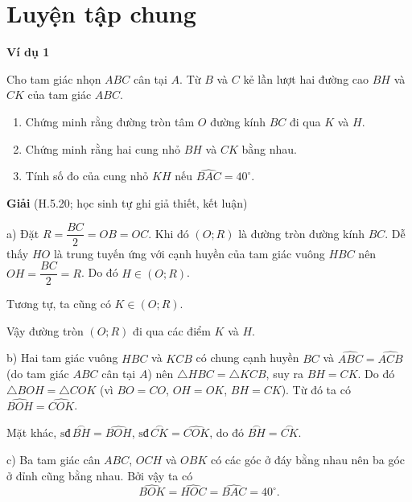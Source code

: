 
\section*{Luyện tập chung}

\begin{lesson}
    \textbf{Ví dụ 1}

    Cho tam giác nhọn $ABC$ cân tại $A$. Từ $B$ và $C$ kẻ lần lượt hai đường cao $BH$ và $CK$ của tam giác $ABC$.

    \begin{enumerate}[label=\alph*)]
        \item Chứng minh rằng đường tròn tâm $O$ đường kính $BC$ đi qua $K$ và $H$.
        \item Chứng minh rằng hai cung nhỏ $BH$ và $CK$ bằng nhau.
        \item Tính số đo của cung nhỏ $KH$ nếu $\widehat{BAC}=40^\circ$.
    \end{enumerate}


    \textbf{Giải} (H.5.20; học sinh tự ghi giả thiết, kết luận)

    a) Đặt $R=\dfrac{BC}{2}=OB=OC$. Khi đó $(O;R)$ là đường tròn đường kính $BC$. Dễ thấy $HO$ là trung tuyến ứng với cạnh huyền của tam giác vuông $HBC$ nên $OH=\dfrac{BC}{2}=R$. Do đó $H\in(O;R)$.

    Tương tự, ta cũng có $K\in(O;R)$.

    Vậy đường tròn $(O;R)$ đi qua các điểm $K$ và $H$.

    b) Hai tam giác vuông $HBC$ và $KCB$ có chung cạnh huyền $BC$ và $\widehat{ABC}=\widehat{ACB}$ (do tam giác $ABC$ cân tại $A$) nên $\triangle HBC=\triangle KCB$, suy ra $BH=CK$. Do đó $\triangle BOH=\triangle COK$ (vì $BO=CO$, $OH=OK$, $BH=CK$). Từ đó ta có $\widehat{BOH}=\widehat{COK}$.

    Mặt khác, $\text{sđ}\,\overset{\frown}{BH}=\widehat{BOH}$, $\text{sđ}\,\overset{\frown}{CK}=\widehat{COK}$, do đó $\overset{\frown}{BH}=\overset{\frown}{CK}$.

    c) Ba tam giác cân $ABC$, $OCH$ và $OBK$ có các góc ở đáy bằng nhau nên ba góc ở đỉnh cũng bằng nhau. Bởi vậy ta có
    \[
        \widehat{BOK}=\widehat{HOC}=\widehat{BAC}=40^\circ.
    \]


\end{lesson}

